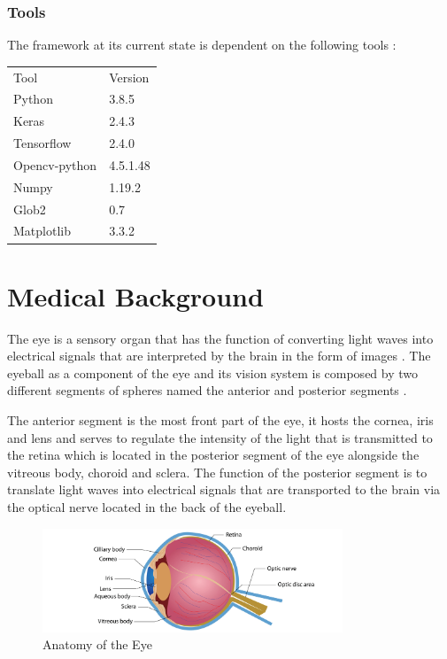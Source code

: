 \documentclass[12pt,a4paper]{scrartcl}
\begin{document}
\subsubsection{Tools}
The framework at its current state is dependent on the following tools : 
    
    \begin{table}[H]
    \begin{tabular}{ll}
    Tool & Version \\
    Python & 3.8.5 \\
    Keras     & 2.4.3   \\
    Tensorflow & 2.4.0 \\
    Opencv-python  &   4.5.1.48 \\
    Numpy & 1.19.2 \\
    Glob2  &  0.7 \\
    Matplotlib & 3.3.2
    \end{tabular}
    \end{table}



\section{Medical Background}\label{s:medical_background}

The eye is a sensory organ that has the function of converting light waves into electrical signals that are interpreted by the brain in the form of images \cite{Rhoades2017}. The eyeball as a component of the eye and its vision system is composed by two different segments of spheres named the anterior and posterior segments \cite{snell1998}.

The anterior segment is the most front part of the eye, it hosts the cornea, iris and lens and serves to regulate the intensity of the light that is transmitted to the retina which is located in the posterior segment of the eye alongside the vitreous body, choroid and sclera. The function of the posterior segment is to translate light waves into electrical signals that are transported to the brain via the optical nerve located in the back of the eyeball. 

\begin{figure}[H]
    \centering
    \includegraphics[width=0.8\textwidth]{./images/anatomy-of-the-eye.jpg}
    \caption{Anatomy of the Eye \cite{eyeanatomy-pic}}
    \label{fig:eye-anatomy}
\end{figure}
\end{document}
